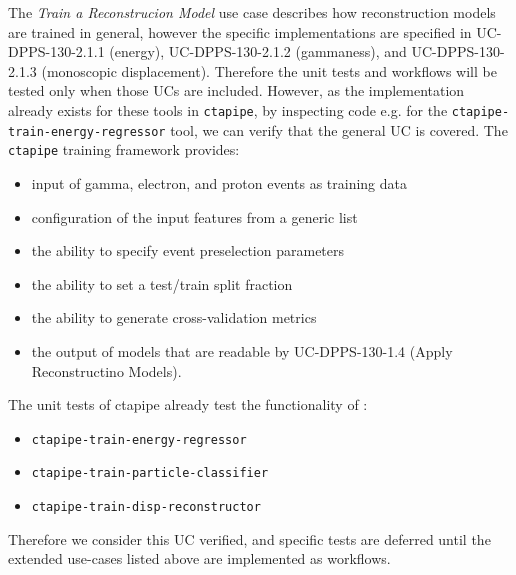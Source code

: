 The \emph{Train a Reconstrucion Model} use case describes how reconstruction models are trained in general, however the specific implementations are specified in UC-DPPS-130-2.1.1 (energy), UC-DPPS-130-2.1.2 (gammaness), and  UC-DPPS-130-2.1.3 (monoscopic displacement). Therefore the unit tests and workflows will be tested only when those UCs are included.  However, as the implementation already exists for these tools in \texttt{ctapipe}, by inspecting code e.g. for the \texttt{ctapipe-train-energy-regressor} tool, we can verify that the general UC is covered.  The \texttt{ctapipe} training framework provides:

\begin{itemize}
  \item input of gamma, electron, and proton events as training data
  \item configuration of the input features from a generic list
  \item the ability to specify event preselection parameters
  \item the ability to set a test/train split fraction
  \item the ability to generate cross-validation metrics
  \item the output of models that are readable by UC-DPPS-130-1.4 (Apply Reconstructino Models).
\end{itemize}

The unit tests of ctapipe already test the functionality of :
\begin{itemize}
  \item \texttt{ctapipe-train-energy-regressor}
  \item \texttt{ctapipe-train-particle-classifier}
  \item \texttt{ctapipe-train-disp-reconstructor}
\end{itemize}

Therefore we consider this UC verified, and specific tests are deferred until
the extended use-cases listed above are implemented as workflows.
